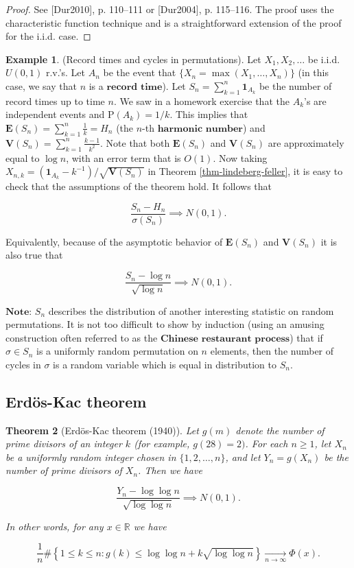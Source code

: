 \documentclass[11pt]{report}
\newcommand{\R}{\mathbb{R}}
\theoremstyle{plain}
\newtheorem{thm}{Theorem}[chapter]
\theoremstyle{definition}
\newtheorem{example}[thm]{Example}
\begin{document}
\begin{proof}
See [Dur2010], p. 110--111 or [Dur2004], p. 115--116.
The proof uses the characteristic function technique
and is a straightforward extension of the proof for
the i.i.d. case.
\end{proof}

\begin{example}
(Record times and cycles in permutations). Let
$X_1, X_2, \ldots$ be i.i.d. $U(0,1)$ r.v.'s. Let
$A_n$ be the event that
$\{X_n = \max(X_1,\ldots,X_n)\}$ (in this case, we
say that $n$ is a $\textbf{record time}$). Let
$S_n = \sum_{k=1}^n \mathbf{1}_{A_k}$ be the number
of record times up to time $n$. We saw in a homework
exercise that the $A_k$'s are independent events and
$\mathrm{P}(A_k) = 1/k$. This implies that
$\mathbf{E}(S_n) = \sum_{k=1}^n \frac{1}{k} = H_n$
(the $n$-th $\textbf{harmonic number}$) and
$\mathbf{V}(S_n) = \sum_{k=1}^n \frac{k-1}{k^2}$.
Note that both $\mathbf{E}(S_n)$ and $\mathbf{V}(S_n)$
are approximately equal to $\log n$, with an error
term that is $O(1)$. Now taking
$X_{n,k} =
(\mathbf{1}_{A_k}-k^{-1})/\sqrt{\mathbf{V}(S_n)}$
in Theorem \ref{thm-lindeberg-feller}, it is easy to check
that the assumptions of the theorem hold. It follows
that

\[
\frac{S_n-H_n}{\sigma(S_n)} \implies N(0,1).
\]

Equivalently, because of the asymptotic behavior of
$\mathbf{E}(S_n)$ and $\mathbf{V}(S_n)$ it is also
true that

\[
\frac{S_n-\log n}{\sqrt{\log n}} \implies N(0,1).
\]

$\textbf{Note:}$ $S_n$ describes the distribution of
another interesting statistic on random permutations.
It is not too difficult to show by induction (using an
amusing construction often referred to as the
$\textbf{Chinese restaurant process}$) that if
$\sigma \in S_n$ is a uniformly random permutation on
$n$ elements, then the number of cycles in $\sigma$
is a random variable which is equal in distribution to
$S_n$.
\end{example}

\subsection{Erdös-Kac theorem}

\begin{thm}[Erdös-Kac theorem (1940)]
Let $g(m)$ denote the number of prime divisors of an
integer $k$ (for example, $g(28)=2)$. For each
$n\ge 1$, let $X_n$ be a uniformly random integer
chosen in $\{1,2,\ldots,n\}$, and let $Y_n=g(X_n)$ be
the number of prime divisors of $X_n$. Then we have

\[
\frac{Y_n - \log\log n}{\sqrt{\log\log n}} \implies N(0,1).
\]

In other words, for any $x\in\R$ we have

\[
\frac{1}{n}\# \left\{ 1\le k\le n: g(k) \le \log\log n + k \sqrt{\log\log n} \right\} \xrightarrow[n\to\infty]{} \Phi(x).
\]

\end{thm}
\end{document}
